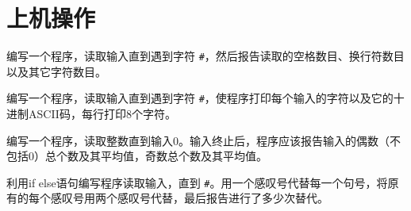 \section{上机操作}

\begin{frame}[fragile]
\begin{free}[例]{}
编写一个程序，读取输入直到遇到字符 \lstinline|#|，然后报告读取的空格数目、换行符数目以及其它字符数目。
\end{free}
\end{frame}

\begin{frame}

\end{frame}

\begin{frame}[fragile]
\begin{free}[例]{}
编写一个程序，读取输入直到遇到字符 \lstinline|#|，使程序打印每个输入的字符以及它的十进制ASCII码，每行打印8个字符。
\end{free}
\end{frame}

\begin{frame}

\end{frame}

\begin{frame}[fragile]
\begin{free}[例]{}
编写一个程序，读取整数直到输入0。输入终止后，程序应该报告输入的偶数（不包括0）总个数及其平均值，奇数总个数及其平均值。
\end{free}
\end{frame}

\begin{frame}

\end{frame}


\begin{frame}[fragile]
\begin{free}[例]{}
利用if else语句编写程序读取输入，直到 \lstinline|#|。用一个感叹号代替每一个句号，将原有的每个感叹号用两个感叹号代替，最后报告进行了多少次替代。
\end{free}
\end{frame}

\begin{frame}

\end{frame}




